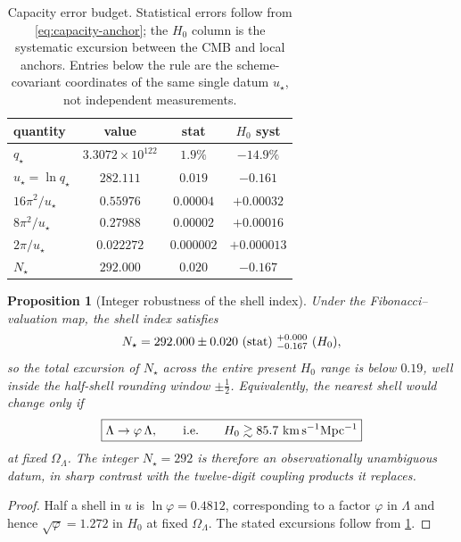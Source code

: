 \documentclass[aps,prd,reprint,nofootinbib,superscriptaddress,floatfix]{revtex4-2}
\numberwithin{equation}{section}
\theoremstyle{definition}
\theoremstyle{plain}
\newtheorem{proposition}{Proposition}[section]
\begin{document}
\begin{table}[t]
\caption{Capacity error budget.  Statistical errors follow from
\cref{eq:capacity-anchor}; the \(H_0\) column is the systematic excursion
between the CMB and local anchors.  Entries below the rule are the
scheme-covariant coordinates of the same single datum \(u_\star\), not
independent measurements.}
\label{tab:error-budget}
\begin{ruledtabular}
\begin{tabular}{lccc}
quantity & value & stat & \(H_0\) syst\\
\hline
\(q_\star\) & \(3.3072\times10^{122}\) & \(1.9\%\) & \(-14.9\%\)\\
\(u_\star=\ln q_\star\) & \(282.111\) & \(0.019\) & \(-0.161\)\\
\hline
\(16\pi^2/u_\star\) & \(0.55976\) & \(0.00004\) & \(+0.00032\)\\
\(8\pi^2/u_\star\) & \(0.27988\) & \(0.00002\) & \(+0.00016\)\\
\(2\pi/u_\star\) & \(0.022272\) & \(0.000002\) & \(+0.000013\)\\
\(N_\star\) & \(292.000\) & \(0.020\) & \(-0.167\)\\
\end{tabular}
\end{ruledtabular}
\end{table}

\begin{proposition}[Integer robustness of the shell index]
\label{prop:shell-robustness}
Under the Fibonacci--valuation map, the shell index satisfies
\begin{equation}
N_\star=292.000\pm0.020\ ({\rm stat})\ ^{+0.000}_{-0.167}\ (H_0),
\end{equation}
so the total excursion of \(N_\star\) across the entire present
\(H_0\) range is below \(0.19\), well inside the half-shell rounding window
\(\pm\tfrac12\).  Equivalently, the nearest shell would change only if
\begin{equation}
\boxed{
\Lambda\to\varphi\,\Lambda,
\qquad\text{i.e.}\qquad
H_0\gtrsim85.7\ {\rm km\,s^{-1}Mpc^{-1}}
}
\end{equation}
at fixed \(\Omega_\Lambda\).  The integer \(N_\star=292\) is therefore an
observationally unambiguous datum, in sharp contrast with the twelve-digit
coupling products it replaces.
\end{proposition}

\begin{proof}
Half a shell in \(u\) is \(\ln\varphi=0.4812\), corresponding to a factor
\(\varphi\) in \(\Lambda\) and hence \(\sqrt\varphi=1.272\) in \(H_0\) at fixed
\(\Omega_\Lambda\).  The stated excursions follow from
\cref{tab:error-budget}.
\end{proof}
\end{document}

